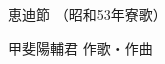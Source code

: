 \documentclass[10pt,b5j]{tarticle} %
\begin{document}
\begin{minipage}[c]{0.7\hsize} %
    \begin{center}
        {\LARGE
            恵迪節 %
        }
        {\small 
            （昭和53年寮歌） %
        }
    \end{center}
\end{minipage}
\begin{minipage}[c]{0.3\hsize} %
    \begin{flushright} %
        甲斐陽輔君 作歌・作曲 %
    \end{flushright}
\end{minipage}
\end{document}

